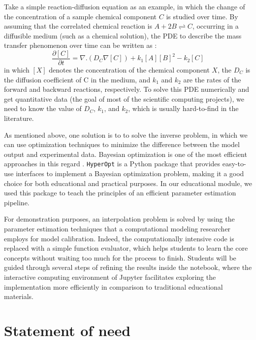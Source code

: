 Take a simple reaction-diffusion equation as an example, in which the change of the concentration of a sample chemical component $C$ is studied over time. By assuming that the correlated chemical reaction is $A + 2B \rightleftharpoons C$, occurring in a diffusible medium (such as a chemical solution), the {PDE} to describe the mass transfer phenomenon over time can be written as \cite{Grindrod1996}:
\begin{equation}
\frac{\partial [C]}{\partial t} = \nabla . \left( D_C \nabla [C] \right) + k_1 [A][B]^2 - k_2 [C]
\end{equation}
in which $[X]$ denotes the concentration of the chemical component $X$, the $D_C$ is the diffusion coefficient of C in the medium, and $k_1$ and $k_2$ are the rates of the forward and backward reactions, respectively. To solve this {PDE} numerically and get quantitative data (the goal of most of the scientific computing projects), we need to know the value of $D_C$, $k_1$, and $k_2$, which is usually hard-to-find in the literature.

As mentioned above, one solution is to to solve the inverse problem, in which we can use optimization techniques to minimize the difference between the model output and experimental data. Bayesian optimization is one of the most efficient approaches in this regard \cite{Mockus1989}. \texttt{HyperOpt} \cite{Bergstra2013} is a Python package that provides easy-to-use interfaces to implement a Bayesian optimization problem, making it a good choice for both educational and practical purposes. In our educational module, we used this package to teach the principles of an efficient parameter estimation pipeline.

For demonstration purposes, an interpolation problem is solved by using the parameter estimation techniques that a computational modeling researcher employs for model calibration. Indeed, the computationally intensive code is replaced with a simple function evaluator, which helps students to learn the core concepts without waiting too much for the process to finish. Students will be guided through several steps of refining the results inside the notebook, where the interactive computing environment of Jupyter facilitates exploring the implementation more efficiently in comparison to traditional educational materials.

\section{Statement of need}

